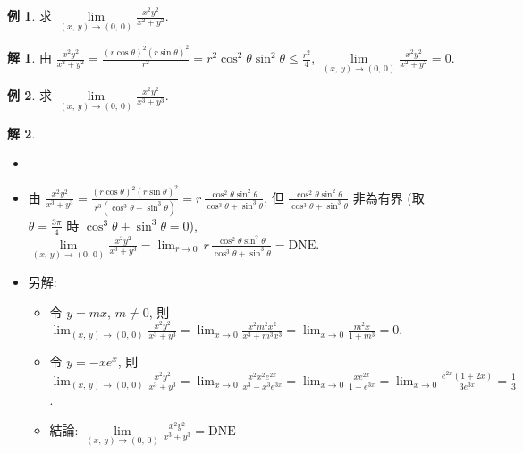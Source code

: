 \documentclass[12pt]{extarticle}
\newcommand{\ds}{\displaystyle}
\theoremstyle{definition}
\newtheorem*{ex}{例}
\newtheorem*{sol}{解}
\begin{document}
\begin{ex}
  求 $\ds\lim\limits_{(x,\,y)\to (0,\,0)}\frac{x^2y^2}{x^2 + y^2}$. 
\end{ex}
\begin{sol}
  由 $\ds\frac{x^2y^2}{x^2 + y^2} = \frac{(r\cos\theta)^2(r\sin\theta)^2}{r^2} = r^2\cos^2\theta\sin^2\theta\leqslant\frac{r^2}{4}$, $\ds\lim\limits_{(x,\,y)\to (0,\,0)}\frac{x^2y^2}{x^2 + y^2} = 0$. 
\end{sol}

\begin{ex}
  求 $\ds\lim\limits_{(x,\,y)\to (0,\,0)}\frac{x^2y^2}{x^3 + y^3}$. 
\end{ex}
\begin{sol}
  \begin{itemize}\setlength{\itemsep}{0pt}
    \item[]
    \item 由 $\ds\frac{x^2y^2}{x^3 + y^3} = \frac{(r\cos\theta)^2(r\sin\theta)^2}{r^3(\cos^3\theta + \sin^3\theta)} = r\,\frac{\cos^2\theta\sin^2\theta}{\cos^3\theta + \sin^3\theta}$, 但 $\ds\frac{\cos^2\theta\sin^2\theta}{\cos^3\theta + \sin^3\theta}$ 非為有界 (取 $\ds\theta = \frac{3\pi}{4}$ 時 $\cos^3\theta + \sin^3\theta = 0$), $\ds\lim\limits_{(x,\,y)\to (0,\,0)}\frac{x^2y^2}{x^3 + y^3} = \lim_{r\to 0}\,r\,\frac{\cos^2\theta\sin^2\theta}{\cos^3\theta + \sin^3\theta} = \text{DNE}$. 
    \item 另解: 
      \begin{itemize}\setlength{\itemsep}{0pt}
        \item 令 $y = mx$, $m\ne 0$, 則 $\ds\lim_{(x,\,y)\to (0,\,0)}\frac{x^2y^2}{x^3 + y^3} = \lim_{x\to 0}\frac{x^2m^2x^2}{x^3 + m^3 x^3} = \lim_{x\to 0}\frac{m^2x}{1 + m^3} = 0$. 
        \item 令 $\ds y = -xe^x$, 則 $\ds\lim_{(x,\,y)\to (0,\,0)}\frac{x^2y^2}{x^3 + y^3} = \lim_{x\to 0}\frac{x^2x^2e^{2x}}{x^3 - x^3e^{3x}} = \lim_{x\to 0}\frac{xe^{2x}}{1 - e^{3x}} = \lim_{x\to 0}\frac{e^{2x}(1 + 2x)}{3e^{3x}} = \frac{1}{3}$. 
        \item 結論: $\ds\lim\limits_{(x,\,y)\to(0,\,0)}\frac{x^2y^2}{x^3 + y^3} = \text{DNE}$
      \end{itemize}
  \end{itemize}
\end{sol}
\end{document}
